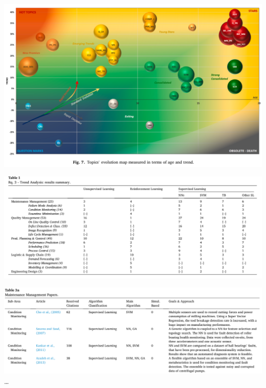 \documentclass[
  letterpaper,
  DIV=11,
  numbers=noendperiod]{scrartcl}
\begin{document}
\begin{itemize}
  \includegraphics{img/2023-01-07-12-44-41.png}
\end{itemize}

\includegraphics{img/2023-01-07-12-32-41.png}

\includegraphics{img/2023-01-07-12-38-32.png} \ldots{}
\end{document}
